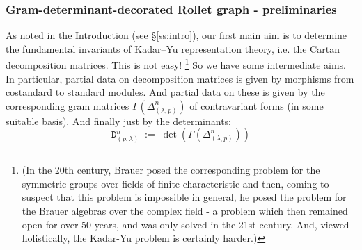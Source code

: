 \documentclass{article}
\newcommand{\ppm}[1]{\textcolor{red}{#1}}
\newcommand{\bajm}[1]{\textcolor{blue}{#1}}
\theoremstyle{definition}
\newcommand{\beq}{\begin{equation}}
\newcommand{\eq}{\end{equation}}
\newcommand{\ignore}[1]{}
\newcommand{\mdef}{\refstepcounter{theorem}       \medskip \noindent ({\bf \thetheorem}) }
\newcommand{\Deltaa}{\Delta}   %
\newcommand{\Deltt}{{\mathtt D}}   %
\newcommand{\Delttt}[2]{\Deltt^{#1}_{(#2)}}  %
\numberwithin{equation}{subsection}
\begin{document}



\ignore{{
\mdef  \ppm{[DELETE this para, or at least delete ref to C1, for now.]}
Later, in \S\ref{ss:walkbases0}, 
we will describe bases for $\Deltaa$-modules in terms of walks on Rollet graphs,
and hence more `geometrical' than diagram bases. And hence potentially better suited to extending the corresponding known bases in case $l=-1$.  
}}

%  


%


\subsubsection{Gram-determinant-decorated Rollet graph - preliminaries}
As noted in the Introduction (see 
\S\ref{ss:intro}),  %
our first main aim is 
to determine the fundamental invariants of Kadar--Yu representation theory, i.e. the Cartan decomposition matrices. 
This is not easy!%
\footnote{(In the 20th century, Brauer posed the corresponding problem for the symmetric groups over fields of finite characteristic and then, coming to suspect that this problem is impossible in general, he posed the problem for the Brauer algebras over the complex field - a problem which  then remained open for over 50 years, and was only solved in the 21st century. And, viewed holistically, the Kadar-Yu problem is certainly harder.)} 
So we have some intermediate aims. 
In particular, partial data on decomposition matrices is given by morphisms from costandard to standard modules. %
And partial data on these is given 
by the corresponding gram matrices 
$\Gamma(\Deltaa^{n}_{(\lambda,p)})$
of contravariant forms (in some suitable basis). 
And finally just by the determinants:
\beq
 \Delttt{n}{p,\lambda}  \; := \;  \det(\Gamma(\Deltaa^{n}_{(\lambda,p)}))\label{eq:detnot}
\eq
\end{document}
